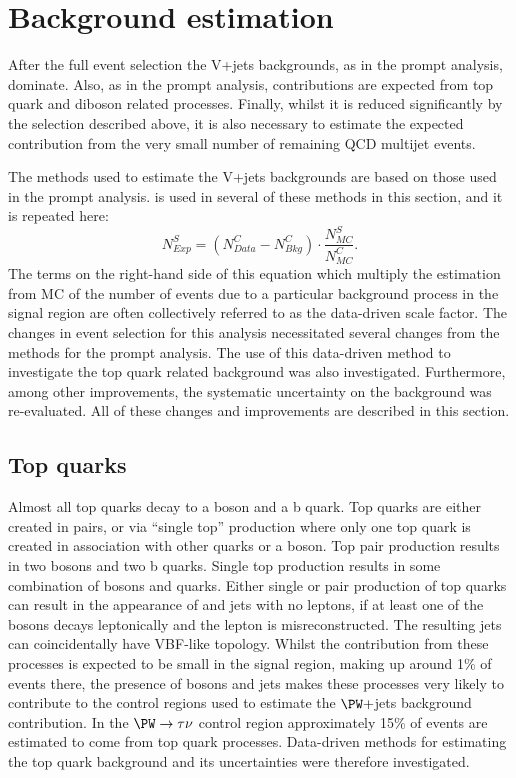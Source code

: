 \section{Background estimation}                                                                                                                          
\label{sec:parkedbkg}
After the full event selection the V+jets backgrounds, as in the prompt analysis, dominate. Also, as in the prompt analysis, contributions are expected from top quark and diboson related processes. Finally, whilst it is reduced significantly by the selection described above, it is also necessary to estimate the expected contribution from the very small number of remaining \ac{QCD} multijet events.

The methods used to estimate the V+jets backgrounds are based on those used in the prompt analysis.  is used in several of these methods in this section, and it is repeated here:
\begin{equation}
  \label{eq:wdatabkgrep}
  N^{S}_{Exp}=\left(N^{C}_{Data}-N^{C}_{Bkg}\right)\cdot\frac{N^{S}_{MC}}{N^{C}_{MC}}.
\end{equation}
The terms on the right-hand side of this equation which multiply the estimation from \ac{MC} of the number of events due to a particular background process in the signal region are often collectively referred to as the data-driven scale factor. The changes in event selection for this analysis necessitated several changes from the methods for the prompt analysis. The use of this data-driven method to investigate the top quark related background was also investigated. Furthermore, among other improvements, the systematic uncertainty on the \Znunu background was re-evaluated. All of these changes and improvements are described in this section.

\subsection{Top quarks}
\label{sec:parkedtop}
Almost all top quarks decay to a \PW boson and a b quark. Top quarks are either created in pairs, or via ``single top'' production where only one top quark is created in association with  other quarks or a \PW boson. Top pair production results in two \PW bosons and two b quarks. Single top production results in some combination of \PW bosons and quarks. Either single or pair production of top quarks can result in the appearance of \MET and jets with no leptons, if at least one of the \PW bosons decays leptonically and the lepton is misreconstructed. The resulting jets can coincidentally have \ac{VBF}-like topology. Whilst the contribution from these processes is expected to be small in the signal region, making up around 1\% of events there, the presence of \PW bosons and jets makes these processes very likely to contribute to the control regions used to estimate the $\PW+$jets background contribution. In the $\PW\rightarrow\tau\nu$ control region approximately 15\% of events are estimated to come from top quark processes. Data-driven methods for estimating the top quark background and its uncertainties were therefore investigated.


